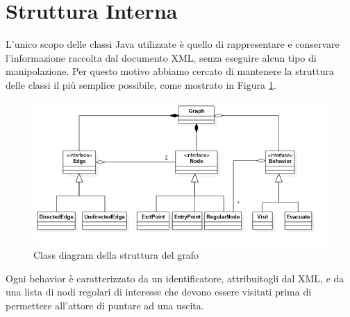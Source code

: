 \section{Struttura Interna}
L'unico scopo delle classi Java utilizzate è quello di rappresentare e conservare l'informazione raccolta dal documento XML, senza eseguire alcun tipo di manipolazione. Per questo motivo abbiamo cercato di mantenere la struttura delle classi il più semplice possibile, come mostrato in Figura \ref{fig:graph-diagram}.\\
\begin{figure}[htbp]
\centering
\includegraphics[width=\textwidth,height=\textheight,keepaspectratio]{images/graph-diagram.png}
\caption{Class diagram della struttura del grafo}
\label{fig:graph-diagram}
\end{figure}
Ogni behavior è caratterizzato da un identificatore, attribuitogli dal XML, e da una lista di nodi regolari di interesse che devono essere visitati prima di permettere all'attore di puntare ad una uscita. 

